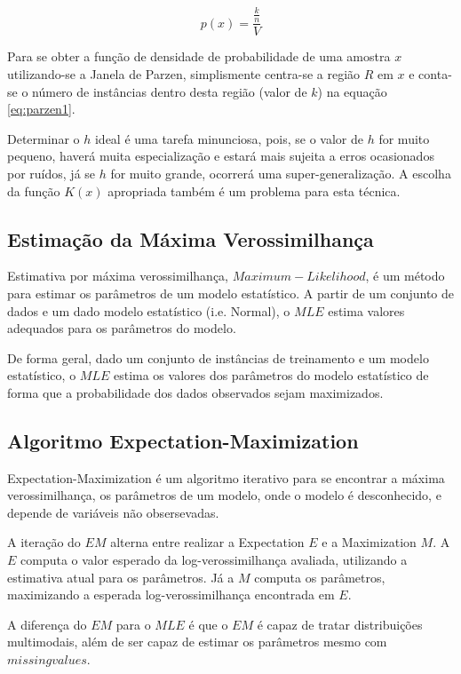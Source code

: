 \begin{equation}
\label{eq:parzen1}
p(x) = \frac{\frac{k}{n}}{V}
\end{equation}

Para se obter a função de densidade de probabilidade de uma amostra $x$ utilizando-se a Janela de Parzen, simplismente centra-se a região $R$ em $x$ e conta-se o número de instâncias dentro desta região (valor de $k$) na equação \ref{eq:parzen1}.

Determinar o $h$ ideal é uma tarefa minunciosa, pois, se o valor de $h$ for muito pequeno, haverá muita especialização e estará mais sujeita a erros ocasionados por ruídos, já se $h$ for muito grande, ocorrerá uma super-generalização. A escolha da função $K(x)$ apropriada também é um problema para esta técnica.

\subsection{Estimação da Máxima Verossimilhança}
\label{subsec:mle}

Estimativa por máxima verossimilhança, $Maximum-Likelihood$, é um método para estimar os parâmetros de um modelo estatístico. A partir de um conjunto de dados e um dado modelo estatístico (i.e. Normal), o $MLE$ estima valores adequados para os parâmetros do modelo.

De forma geral, dado um conjunto de instâncias de treinamento e um modelo estatístico, o $MLE$ estima os valores dos parâmetros do modelo estatístico de forma que a probabilidade dos dados observados sejam maximizados.

\subsection{Algoritmo Expectation-Maximization}
\label{subsec:em}
Expectation-Maximization é um algoritmo iterativo para se encontrar a máxima verossimilhança, os parâmetros de um modelo, onde o modelo é desconhecido, e depende de variáveis não obsersevadas. 

A iteração do $EM$ alterna entre realizar a Expectation $E$ e a Maximization $M$. A $E$ computa o valor esperado da log-verossimilhança avaliada, utilizando a estimativa atual para os parâmetros. Já a $M$ computa os parâmetros, maximizando a esperada log-verossimilhança encontrada em $E$.

A diferença do $EM$ para o $MLE$ é que o $EM$ é capaz de tratar distribuições multimodais, além de ser capaz de estimar os parâmetros mesmo com $missing values$.

